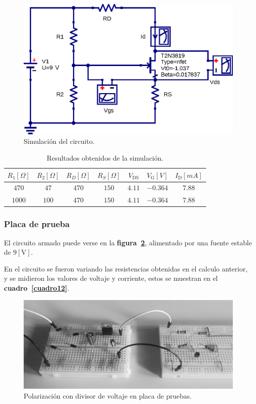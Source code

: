 \begin{figure}[!h]
\centering
\includegraphics[scale=1.00]{diagramas/figura15.eps}
\caption{Simulación del circuito.}
\label{figura15}
\end{figure}

\begin{table}[!h]
\begin{center}
    \begin{tabular}{|c|c|c|c||c||c|c|}
    \hline
    $R_1[\Omega]$ & $R_2[\Omega]$ & $R_D[\Omega]$ & $R_S[\Omega]$ &
    $V_{\text{DS}}$ & $V_{\text{G}}[V]$ & $I_{\text{D}}[mA]$
    \tabularnewline \hline \hline
    $ 470$ & $ 47$ & $470$ & $150$ & $4.11$ & $-0.364$ & $7.88$ \tabularnewline \hline
    $1000$ & $100$ & $470$ & $150$ & $4.11$ & $-0.364$ & $7.88$ \tabularnewline \hline
    \end{tabular}
\end{center}
\caption{Resultados obtenidos de la simulación.}
\label{cuadro11}
\end{table}

\subsubsection{Placa de prueba}
El circuito armado puede verse en la \textbf{figura~\ref{figura16}}, alimentado
por una fuente estable de $9[\text{V}]$.

En el circuito se fueron variando las resistencias obtenidas en el calculo
anterior, y se midieron los valores de voltaje y corriente, estos se muestran
en el \textbf{cuadro~\ref{cuadro12}}.

\begin{figure}[!h]
\centering
\includegraphics[scale=0.125]{diagramas/figura16.eps}
\caption{Polarización con divisor de voltaje en placa de pruebas.}
\label{figura16}
\end{figure}

